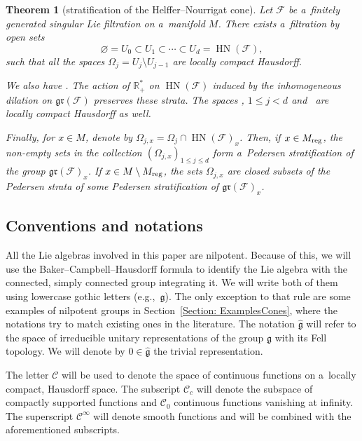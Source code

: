 \documentclass[10pt,a4paper]{article}
\newcommand{\R}{\mathbb R} %
\newcommand{\CCC}{\mathscr{C}} %
\newcommand{\g}{\mathfrak{g}} %
\newcommand{\HN}{\operatorname{HN}} %
\newcommand{\Fb}{\mathcal{F}} %
\newcommand{\gr}{\mathfrak{gr}} %
\numberwithin{equation}{section}
\newtheorem{thm}{Theorem}[section]
\theoremstyle{definition}
\begin{document}
\begin{thm}[stratification of the Helffer--Nourrigat cone]\label{Theorem:Stratification}
 Let $\Fb$ be a~finitely generated singular Lie filtration on a~manifold $M$. There exists a~filtration by open sets
 \[\varnothing = U_0 \subset U_1 \subset \cdots \subset U_d = \HN(\Fb),\]
 such that all the spaces $\Omega_j = U_j\setminus U_{j-1}$ are locally compact Hausdorff.

 We also have \smash{$\HN_0(\Fb) = \bigsqcup_{j=1}^{d-1} \Omega_j \sqcup (\Omega_d \setminus M)$}.
 The action of $\R^*_+$ on $\HN(\Fb)$ induced by the inhomogeneous dilation on $\gr(\Fb)$ preserves these strata. The spaces \smash{${\Omega_j}/{\R^*_+}$}, $1\leq j < d$ and~\smash{${(\Omega_d\setminus M)}/{\R^*_+}$} are locally compact Hausdorff as well.

 Finally, for $x\in M$, denote by $\Omega_{j,x} = \Omega_j\cap \HN(\Fb)_{x}$. Then, if $x \in M_{\rm reg}$, the non-empty sets in the collection $(\Omega_{j,x})_{1\leq j \leq d}$ form a~Pedersen stratification of the group $\gr(\Fb)_x$. If $x \in M \setminus M_{\rm reg}$, the sets $\Omega_{j,x}$ are closed subsets of the Pedersen strata of some Pedersen stratification of $\gr(\Fb)_x$.
\end{thm}

\subsection*{Conventions and notations} All the Lie algebras involved in this paper are nilpotent. Because of this, we will use the Baker--Campbell--Hausdorff formula to identify the Lie algebra with the connected, simply connected group integrating it. We will write both of them using lowercase gothic letters (e.g.,~$\g$). The only exception to that rule are some examples of nilpotent groups in Section~\ref{Section: ExamplesCones}, where the notations try to match existing ones in the literature. The notation $\widehat{\g}$ will refer to the space of irreducible unitary representations of the group $\g$ with its Fell topology. We will denote by $0 \in \widehat{\g}$ the trivial representation.

The letter $\CCC$ will be used to denote the space of continuous functions on a~locally compact, Hausdorff space. The subscript $\CCC_c$ will denote the subspace of compactly supported functions and $\CCC_0$ continuous functions vanishing at infinity. The superscript $\CCC^{\infty}$ will denote smooth functions and will be combined with the aforementioned subscripts.
\end{document}
